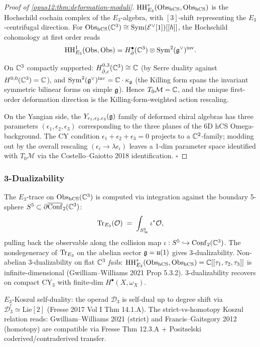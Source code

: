 \begin{proof}[Proof of \ref{opus12:thm:deformation-moduli}]
$\mathrm{HH}^*_{E_3}(\mathrm{Obs}_{\mathrm{hCS}}, \mathrm{Obs}_{\mathrm{hCS}})$ is the Hochschild cochain
complex of the $E_3$-algebra, with $[3]$-shift representing the
$E_3$-centrifugal direction. For $\mathrm{Obs}_{\mathrm{hCS}}(\mathbb{C}^3) \cong
\mathrm{Sym}(\mathcal{E}^\vee[1])[[\hbar]]$, the Hochschild cohomology at first order
reads
\[
\mathrm{HH}^1_{E_3}(\mathrm{Obs}, \mathrm{Obs}) = H^\bullet_{\bar\partial}(\mathbb{C}^3)
\otimes \mathrm{Sym}^2(\mathfrak{g}^\vee)^{\mathrm{inv}}.
\]

On $\mathbb{C}^3$ compactly supported:
$H^{0,3}_{\bar\partial, \mathrm{c}}(\mathbb{C}^3) \cong \mathbb{C}$ (by
Serre duality against $H^{0,0}(\mathbb{C}^3) = \mathbb{C}$), and
$\mathrm{Sym}^2(\mathfrak{g}^\vee)^{\mathrm{inv}} = \mathbb{C} \cdot \kappa_{\mathfrak{g}}$
(the Killing form spans the invariant symmetric bilinear forms on
simple $\mathfrak{g}$). Hence $T_0 \mathcal M = \mathbb{C}$, and the unique
first-order deformation direction is the Killing-form-weighted
action rescaling.

On the Yangian side, the $Y_{\epsilon_1, \epsilon_2, \epsilon_3}(\mathfrak{g})$
family of deformed chiral algebras has three parameters
$(\epsilon_1, \epsilon_2, \epsilon_3)$ corresponding to the three
planes of the 6D hCS Omega-background. The CY condition
$\epsilon_1 + \epsilon_2 + \epsilon_3 = 0$ projects to a
$\mathbb{C}^2$-family; modding out by the overall rescaling
$(\epsilon_i \to \lambda \epsilon_i)$ leaves a 1-dim parameter
space identified with $T_0 \mathcal M$ via the Costello--Gaiotto 2018
identification. $\square$
\end{proof}

\subsubsection{3-Dualizability}

\begin{theorem}\ClaimStatusTheorem
\label{opus12:thm:dualizability}
The $E_3$-trace on $\mathrm{Obs}_{\mathrm{hCS}}(\mathbb{C}^3)$ is computed via
integration against the boundary 5-sphere
$S^5 \subset \partial \overline{\mathrm{Conf}}_2(\mathbb{C}^3)$:
\[
\mathrm{Tr}_{E_3}(\mathcal{O}) \;=\; \int_{S^5_\infty} \iota^* \mathcal{O},
\]
pulling back the observable along the collision map
$\iota: S^5 \hookrightarrow \mathrm{Conf}_2(\mathbb{C}^3)$. The nondegeneracy
of $\mathrm{Tr}_{E_3}$ on the abelian sector
$\mathfrak{g} = \mathfrak{u}(1)$ gives 3-dualizability. Non-abelian 3-dualizability on
flat $\mathbb{C}^3$ \emph{fails}: $\mathrm{HH}^*_{E_3}(\mathrm{Obs}_{\mathrm{hCS}}, \mathrm{Obs}_{\mathrm{hCS}})
= \mathbb{C}[[\tau_1, \tau_2, \tau_3]]$ is infinite-dimensional
(Gwilliam--Williams 2021 Prop 5.3.2). 3-dualizability recovers on
compact CY$_3$ with finite-dim $H^\bullet(X, \omega_X)$.

$E_3$-Koszul self-duality: the operad $\mathcal D_3$ is self-dual
up to degree shift via $\mathcal D_3^! \simeq \mathrm{Lie}[2]$
(Fresse 2017 Vol I Thm 14.1.A). The strict-vs-homotopy Koszul
relation reads: Gwilliam--Williams 2021 (strict) and
Francis--Gaitsgory 2012 (homotopy) are compatible via
Fresse Thm 12.3.A + Positselski coderived/contraderived transfer.
\end{theorem}

